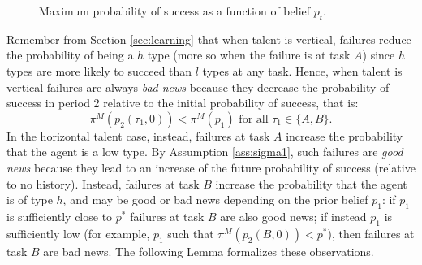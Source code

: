 \documentclass[12pt,american]{paper}
\theoremstyle{remark}
\begin{document}
\begin{figure}[h!]
    \centering
    \centering
  \caption{Maximum probability of success as a function of belief $p_t$.}
  \label{fig: success 2}
\end{figure}
%
Remember from Section \ref{sec:learning} that when talent is vertical, failures reduce the probability of being a $h$ type (more so when the failure is at task $A$) since $h$ types are more likely to succeed than $l$ types at any task. Hence, when talent is vertical failures are always \textit{bad news} because they decrease the probability of success in period 2 relative to the initial probability of success, that is:
\[
\pi^M(p_2(\tau_1,0))<\pi^M(p_1) \mbox{ for all } \tau_1\in \{A,B\}.
\]
In the horizontal talent case, instead, failures at task $A$ increase the probability that the agent is a low type. By Assumption \ref{ass:sigma1}, such failures are \textit{good news } because they lead to an increase of the future probability of success (relative to no history). Instead, failures at task $B$ increase the probability that the agent is of type $h$, and may be good or bad news depending on the prior belief $p_1$: if $p_1$ is sufficiently close to $p^*$ failures at task $B$ are also good news; if instead $p_1$ is sufficiently low (for example, $p_1$ such that $\pi^M(p_2(B,0))<p^*$), then failures at task $B$ are bad news. The following Lemma formalizes these observations.
\end{document}
